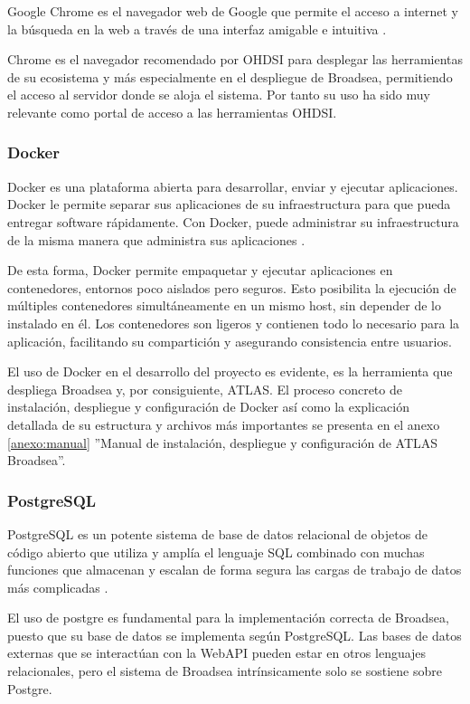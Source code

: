 Google Chrome es el navegador web de Google que permite el acceso a internet y la búsqueda en la web a través de una interfaz amigable e intuitiva \parencite{GoogleChrome}. 

Chrome es el navegador recomendado por OHDSI para desplegar las herramientas de su ecosistema y más especialmente en el despliegue de Broadsea, permitiendo el acceso al servidor donde se aloja el sistema. Por tanto su uso ha sido muy relevante como portal de acceso a las herramientas OHDSI.


\subsubsection{Docker}

Docker es una plataforma abierta para desarrollar, enviar y ejecutar aplicaciones. Docker le permite separar sus aplicaciones de su infraestructura para que pueda entregar software rápidamente. Con Docker, puede administrar su infraestructura de la misma manera que administra sus aplicaciones \parencite{DockerWebsite}.

De esta forma, Docker permite empaquetar y ejecutar aplicaciones en contenedores, entornos poco aislados pero seguros. Esto posibilita la ejecución de múltiples contenedores simultáneamente en un mismo host, sin depender de lo instalado en él. Los contenedores son ligeros y contienen todo lo necesario para la aplicación, facilitando su compartición y asegurando consistencia entre usuarios. 

El uso de Docker en el desarrollo del proyecto es evidente, es la herramienta que despliega Broadsea y, por consiguiente, ATLAS. El proceso concreto de instalación, despliegue y configuración de Docker así como la explicación detallada de su estructura y archivos más importantes se presenta en el anexo \ref{anexo:manual} ''Manual de instalación, despliegue y configuración de ATLAS Broadsea''.

\subsubsection{PostgreSQL}

PostgreSQL es un potente sistema de base de datos relacional de objetos de código abierto que utiliza y amplía el lenguaje SQL combinado con muchas funciones que almacenan y escalan de forma segura las cargas de trabajo de datos más complicadas \parencite{PostgreWebsite}.

El uso de postgre es fundamental para la implementación correcta de Broadsea, puesto que su base de datos se implementa según PostgreSQL. Las bases de datos externas que se interactúan con la WebAPI pueden estar en otros lenguajes relacionales, pero el sistema de Broadsea intrínsicamente solo se sostiene sobre Postgre.

